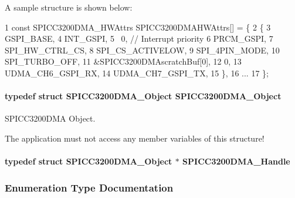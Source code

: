 A sample structure is shown below\+: 
\begin{DoxyCode}
1 const SPICC3200DMA\_HWAttrs SPICC3200DMAHWAttrs[] = \{
2     \{
3         GSPI\_BASE,
4         INT\_GSPI,
5         ~0,         // Interrupt priority
6         PRCM\_GSPI,
7         SPI\_HW\_CTRL\_CS,
8         SPI\_CS\_ACTIVELOW,
9         SPI\_4PIN\_MODE,
10         SPI\_TURBO\_OFF,
11         &SPICC3200DMAscratchBuf[0],
12         0,
13         UDMA\_CH6\_GSPI\_RX,
14         UDMA\_CH7\_GSPI\_TX,
15     \},
16     ...
17 \};
\end{DoxyCode}
\paragraph[{S\+P\+I\+C\+C3200\+D\+M\+A\+\_\+\+Object}]{\setlength{\rightskip}{0pt plus 5cm}typedef struct {\bf S\+P\+I\+C\+C3200\+D\+M\+A\+\_\+\+Object}  {\bf S\+P\+I\+C\+C3200\+D\+M\+A\+\_\+\+Object}}\label{_s_p_i_c_c3200_d_m_a_8h_a5a581b5a475f9cd3e8b23355cc30ab7f}


S\+P\+I\+C\+C3200\+D\+M\+A Object. 

The application must not access any member variables of this structure! 
\paragraph[{S\+P\+I\+C\+C3200\+D\+M\+A\+\_\+\+Handle}]{\setlength{\rightskip}{0pt plus 5cm}typedef struct {\bf S\+P\+I\+C\+C3200\+D\+M\+A\+\_\+\+Object} $\ast$ {\bf S\+P\+I\+C\+C3200\+D\+M\+A\+\_\+\+Handle}}\label{_s_p_i_c_c3200_d_m_a_8h_ae757f6e0468145143c9c839a4e3cf353}


\subsubsection{Enumeration Type Documentation}
